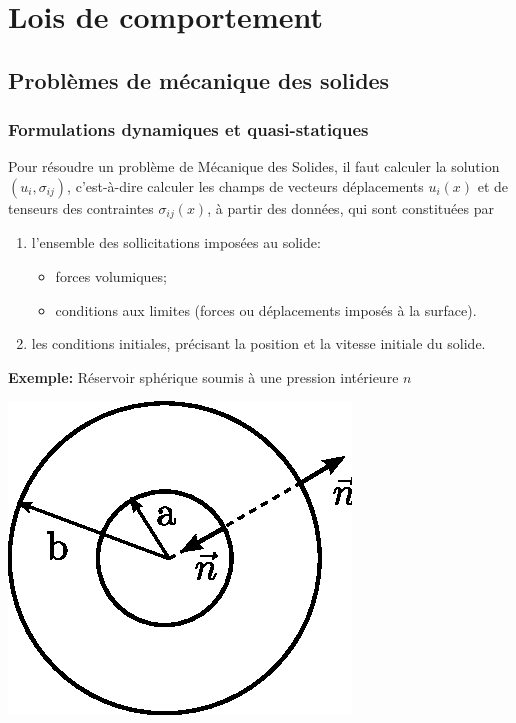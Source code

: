 \chapter{Lois de comportement} \label{chap:Ch04}
\section{Problèmes de mécanique des solides} \label{sec:Ch04-1}
\subsection{Formulations dynamiques et quasi-statiques}  \label{ssec:Ch04-1.1}
Pour résoudre un problème de Mécanique des Solides, il faut calculer la solution $(u_i, \sigma_{ij})$, c'est-à-dire calculer les champs de vecteurs déplacements $u_i(x)$ et de tenseurs des contraintes $\sigma_{ij}(x)$, à partir des données, qui sont constituées par
\begin{enumerate}
    \item l'ensemble des sollicitations imposées au solide:
        \begin{itemize}
            \item forces volumiques;
            \item conditions aux limites (forces ou déplacements imposés à la surface).
        \end{itemize}
    \item les conditions initiales, précisant la position et la vitesse initiale du solide.
\end{enumerate}
\textbf{Exemple:} Réservoir sphérique soumis à une pression intérieure $n$
\begin{center}
    \includegraphics{../images/T1_Ch04-0001}
\end{center}
